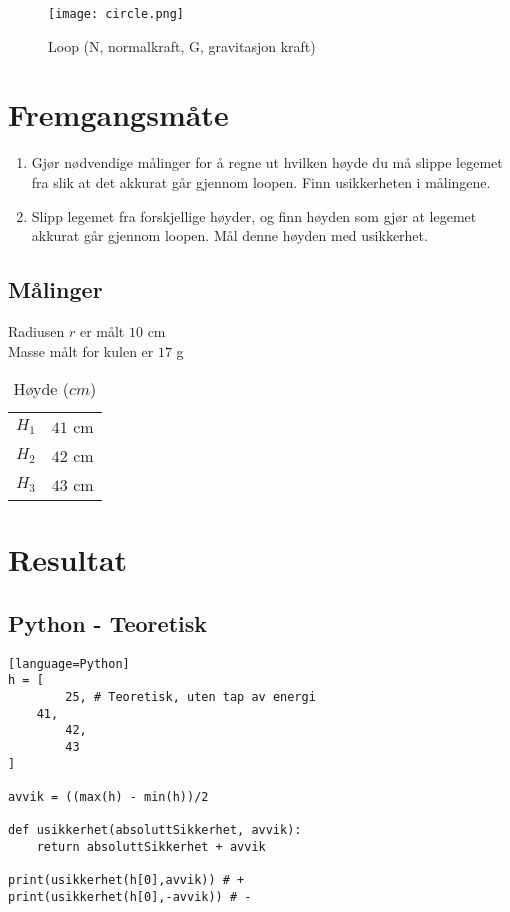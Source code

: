\documentclass[a4paper]{article}
\begin{document}
\begin{figure}
  \centering
  \texttt{[image: circle.png]}
  \caption{Loop (N, normalkraft, G, gravitasjon kraft)}
  \label{fig:circle.png} 
\end{figure}

\section{Fremgangsmåte} %
\label{sec:fremgangsmåte}
\begin{enumerate}
	\item   Gjør nødvendige målinger for å regne ut hvilken høyde du må slippe legemet fra slik at det akkurat går gjennom loopen. Finn usikkerheten i målingene.
	\item Slipp legemet fra forskjellige høyder, og finn høyden som gjør at legemet akkurat går gjennom loopen. Mål denne høyden med usikkerhet.
\end{enumerate}
\subsection{Målinger} %
\label{sub:målinger}
Radiusen $r$ er målt $10$ cm \\
Masse målt for kulen er $17$ g
\begin{table}[htpb]
	\centering
	\caption{Høyde ($cm$)}
	\label{tab:label}
	\begin{tabular}{c c}
		$H_1$ & $41$ cm \\
		$H_2$ & $42$ cm \\
		$H_3$ & $43$ cm \\
	\end{tabular}
\end{table}
\newpage
\section{Resultat} %
\label{sec:resultat}
\subsection{Python - Teoretisk} %
\label{sub:python_teoretisk}
\begin{lstlisting}[frame=single][language=Python]
h = [	
        25, # Teoretisk, uten tap av energi 
	41,
        42,
        43
]

avvik = ((max(h) - min(h))/2 

def usikkerhet(absoluttSikkerhet, avvik):
    return absoluttSikkerhet + avvik

print(usikkerhet(h[0],avvik)) # +
print(usikkerhet(h[0],-avvik)) # -
\end{lstlisting}
\end{document}
